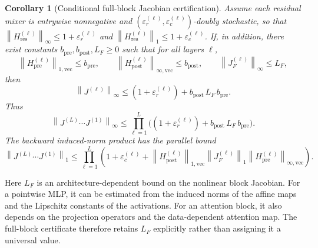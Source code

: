 \documentclass[10pt]{article}
\numberwithin{equation}{section}
\theoremstyle{plain}
\newtheorem{corollary}[theorem]{Corollary}
\theoremstyle{definition}
\theoremstyle{remark}
\newcommand{\norm}[1]{\left\lVert #1 \right\rVert}
\newcommand{\Hres}{H_{\mathrm{res}}}
\newcommand{\Hpre}{H_{\mathrm{pre}}}
\newcommand{\Hpost}{H_{\mathrm{post}}}
\begin{document}
\begin{corollary}[Conditional full-block Jacobian certification]\label{cor:jacobian-cert}
Assume each residual mixer is entrywise nonnegative and $(\varepsilon_r^{(\ell)},\varepsilon_c^{(\ell)})$-doubly stochastic, so that
$\norm{\Hres^{(\ell)}}_\infty\le 1+\varepsilon_r^{(\ell)}$ and
$\norm{\Hres^{(\ell)}}_1\le 1+\varepsilon_c^{(\ell)}$. If, in addition, there exist constants
$b_{\mathrm{pre}},b_{\mathrm{post}},L_F\ge 0$ such that for all layers $\ell$,
\begin{equation}\label{eq:jac-assumptions}
\norm{\Hpre^{(\ell)}}_{1,\mathrm{vec}}\le b_{\mathrm{pre}},
\qquad
\norm{\Hpost^{(\ell)}}_{\infty,\mathrm{vec}}\le b_{\mathrm{post}},
\qquad
\norm{J_F^{(\ell)}}_\infty \le L_F,
\end{equation}
then
\begin{equation}\label{eq:jac-cert}
\norm{J^{(\ell)}}_\infty
\le
(1+\varepsilon_r^{(\ell)}) + b_{\mathrm{post}}\,L_F\,b_{\mathrm{pre}}.
\end{equation}
Thus
\begin{equation}
\norm{J^{(L)}\cdots J^{(1)}}_\infty
\le
\prod_{\ell=1}^L\Big((1+\varepsilon_r^{(\ell)}) + b_{\mathrm{post}}\,L_F\,b_{\mathrm{pre}}\Big).
\end{equation}
The backward induced-norm product has the parallel bound
\begin{equation}\label{eq:jac-cert-one-product}
\norm{J^{(L)}\cdots J^{(1)}}_1
\le
\prod_{\ell=1}^L
\left(
1+\varepsilon_c^{(\ell)}
+
\norm{\Hpost^{(\ell)}}_{1,\mathrm{vec}}
\norm{J_F^{(\ell)}}_1
\norm{\Hpre^{(\ell)}}_{\infty,\mathrm{vec}}
\right).
\end{equation}
\end{corollary}

Here $L_F$ is an architecture-dependent bound on the nonlinear block Jacobian.
For a pointwise MLP, it can be estimated from the induced norms of the affine maps
and the Lipschitz constants of the activations. For an attention block, it also depends
on the projection operators and the data-dependent attention map. The full-block
certificate therefore retains $L_F$ explicitly rather than assigning it a universal value.
\end{document}
